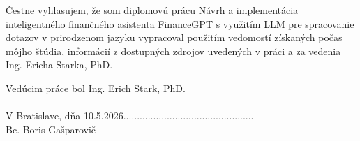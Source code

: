 \noindent
Čestne vyhlasujem, že som diplomovú prácu Návrh a implementácia inteligentného finančného
asistenta FinanceGPT s využitím LLM pre spracovanie dotazov v prirodzenom jazyku vypracoval
použitím vedomostí získaných počas môjho štúdia, informácií z dostupných zdrojov
uvedených v práci a za vedenia Ing. Ericha Starka, PhD.

\noindent
Vedúcim práce bol Ing. Erich Stark, PhD. \\ \\
\newline
\newline
\noindent
V Bratislave, dňa 10.5.2026\hspace*{5cm}................................................\\
\hspace*{11cm} Bc. Boris Gašparovič\\
